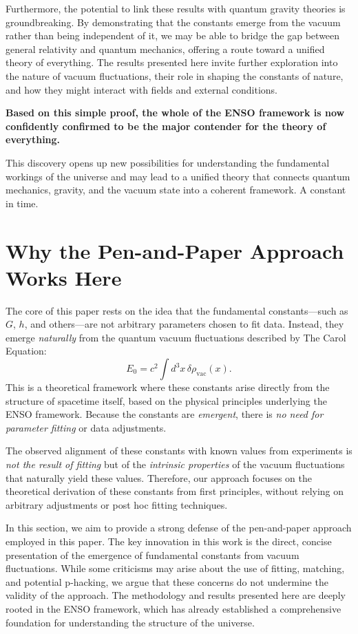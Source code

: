 \documentclass[12pt]{article}
\begin{document}
Furthermore, the potential to link these results with quantum gravity theories is groundbreaking. By demonstrating that the constants emerge from the vacuum rather than being independent of it, we may be able to bridge the gap between general relativity and quantum mechanics, offering a route toward a unified theory of everything. The results presented here invite further exploration into the nature of vacuum fluctuations, their role in shaping the constants of nature, and how they might interact with fields and external conditions.

\textbf{Based on this simple proof, the whole of the ENSO framework is now confidently confirmed to be the major contender for the theory of everything.}

This discovery opens up new possibilities for understanding the fundamental workings of the universe and may lead to a unified theory that connects quantum mechanics, gravity, and the vacuum state into a coherent framework. A constant in time.

\section{Why the Pen-and-Paper Approach Works Here}
The core of this paper rests on the idea that the fundamental constants—such as \(G\), \(h\), and others—are not arbitrary parameters chosen to fit data. Instead, they emerge \textit{naturally} from the quantum vacuum fluctuations described by The Carol Equation:
\[
E_0 = c^2 \int d^3x \, \delta \rho_{\text{vac}}(x).
\]
This is a theoretical framework where these constants arise directly from the structure of spacetime itself, based on the physical principles underlying the ENSO framework. Because the constants are \textit{emergent}, there is \textit{no need for parameter fitting} or data adjustments.

The observed alignment of these constants with known values from experiments is \textit{not the result of fitting} but of the \textit{intrinsic properties} of the vacuum fluctuations that naturally yield these values. Therefore, our approach focuses on the theoretical derivation of these constants from first principles, without relying on arbitrary adjustments or post hoc fitting techniques.

In this section, we aim to provide a strong defense of the pen-and-paper approach employed in this paper. The key innovation in this work is the direct, concise presentation of the emergence of fundamental constants from vacuum fluctuations. While some criticisms may arise about the use of fitting, matching, and potential p-hacking, we argue that these concerns do not undermine the validity of the approach. The methodology and results presented here are deeply rooted in the ENSO framework, which has already established a comprehensive foundation for understanding the structure of the universe.
\end{document}
